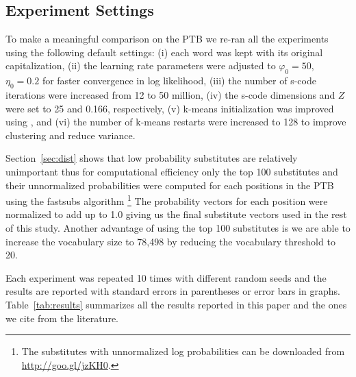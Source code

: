 \subsection{Experiment Settings}\label{sec:expset}

To make a meaningful comparison on the PTB we re-ran all the
experiments using the following default settings: (i) each word was
kept with its original capitalization, (ii) the learning rate
parameters were adjusted to $\varphi_0=50$, $\eta_0=0.2$ for faster
convergence in log likelihood, (iii) the number of s-code iterations
were increased from 12 to 50 million, (iv) the s-code dimensions and
$Z$ were set to 25 and 0.166, respectively, (v) k-means initialization
was improved using \cite{arthur2007k}, and (vi) the number of k-means
restarts were increased to 128 to improve clustering and reduce
variance.

Section~\ref{sec:dist} shows that low probability substitutes are
relatively unimportant thus for computational efficiency only the top
100 substitutes and their unnormalized probabilities were computed for
each positions in the PTB using the {\sc fastsubs} algorithm
\cite{yuret2021fastsub}\footnote{The substitutes with unnormalized log
  probabilities can be downloaded from
  \mbox{\url{http://goo.gl/jzKH0}}.}  The probability vectors for each
position were normalized to add up to 1.0 giving us the final
substitute vectors used in the rest of this study.  Another advantage
of using the top 100 substitutes is we are able to increase the
vocabulary size to 78,498 by reducing the vocabulary threshold to 20.

Each experiment was repeated 10 times with different random seeds and
the results are reported with standard errors in parentheses or error
bars in graphs.  Table~\ref{tab:results} summarizes all the results
reported in this paper and the ones we cite from the literature.

